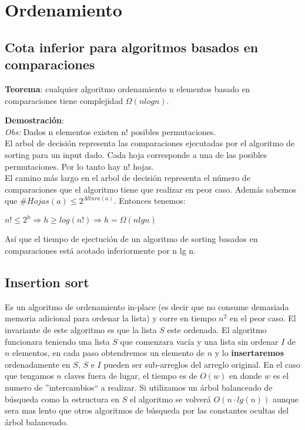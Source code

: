 \section{Ordenamiento}

\subsection{Cota inferior para algoritmos basados en comparaciones}

\textbf{Teorema}: cualquier algoritmo ordenamiento n elementos basado en comparaciones tiene complejidad $\Omega(n log n)$.

\textbf{Demostraci\'on}: \\
\indent \textit{Obs:} Dados n elementos existen n! posibles permutaciones. \\
El arbol de decisi\'on representa las comparaciones ejecutadas por el algoritmo de sorting para un input dado. Cada hoja corresponde a una de las posibles permutaciones. Por lo tanto hay n! hojas. \\
El camino m\'as largo en el arbol de decisi\'on representa el n\'umero de comparaciones que el algoritmo tiene que realizar en peor caso.
Adem\'as sabemos que $\#Hojas(a) \leq 2^{Altura(a)}$. Entonces tenemos:

$ n! \leq 2^{h}  \Rightarrow h \geq log(n!)  \Rightarrow h = \Omega(n lg n)$

As\'i que el tiempo de ejectuci\'on de un algoritmo de sorting basados en comparaciones est\'a acotado inferiormente por n lg n.


\subsection{Insertion sort}

Es un algoritmo de ordenamiento in-place (es decir que no consume demasiada memoria adicional para ordenar la lista) y corre en tiempo $n^2$ en el peor caso. El invariante de este algoritmo es que la lista $S$ este ordenada. El algoritmo funcionara teniendo una lista $S$ que comenzara vac\'ia y una lista sin ordenar $I$ de $n$ elementos, en cada paso obtendremos un elemento de $n$ y lo \textbf{insertaremos} ordenadamente en $S$, $S$ e $I$ pueden ser sub-arreglos del arreglo original. En el caso que tengamos $n$ claves fuera de lugar, el tiempo es de $O(w)$ en donde $w$ es el numero de ''intercambios`` a realizar. Si utilizamos un \'arbol balanceado de b\'usqueda como la estructura en $S$ el algoritmo se volver\'a $O(n\cdot lg(n))$ aunque sera mas lento que otros algoritmos de b\'usqueda por las constantes ocultas del \'arbol balanceado.

